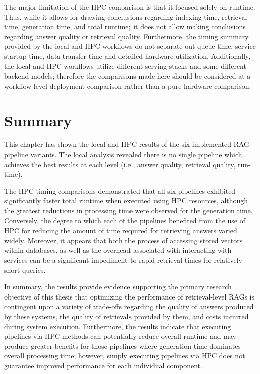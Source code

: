 The major limitation of the \ac{HPC} comparison is that it focused solely on runtime. Thus, while it allows for drawing conclusions regarding indexing time, retrieval time, generation time, and total runtime; it does not allow making conclusions regarding answer quality or retrieval quality. Furthermore, the timing summary provided by the local and \ac{HPC} workflows do not separate out queue time, service startup time, data transfer time and detailed hardware utilization. Additionally, the local and \ac{HPC} workflows utilize different serving stacks and some different backend models; therefore the comparisons made here should be considered at a workflow level deployment comparison rather than a pure hardware comparison.

\section{Summary}

This chapter has shown the local and \ac{HPC} results of the six implemented \ac{RAG} pipeline variants. The local analysis revealed there is no single pipeline which achieves the best results at each level (i.e., answer quality, retrieval quality, run-time).

The \ac{HPC} timing comparisons demonstrated that all six pipelines exhibited significantly faster total runtime when executed using \ac{HPC} resources, although the greatest reductions in processing time were observed for the generation time. Conversely, the degree to which each of the pipelines benefited from the use of \ac{HPC} for reducing the amount of time required for retrieving answers varied widely. Moreover, it appears that both the process of accessing stored vectors within databases, as well as the overhead associated with interacting with services can be a significant impediment to rapid retrieval times for relatively short queries.

In summary, the results provide evidence supporting the primary research objective of this thesis that optimizing the performance of retrieval-level \acp{RAG} is contingent upon a variety of trade-offs regarding the quality of answers produced by these systems, the quality of retrievals provided by them, and costs incurred during system execution. Furthermore, the results indicate that executing pipelines via \ac{HPC} methods can potentially reduce overall runtime and may produce greater benefits for those pipelines where generation time dominates overall processing time; however, simply executing pipelines via \ac{HPC} does not guarantee improved performance for each individual component.